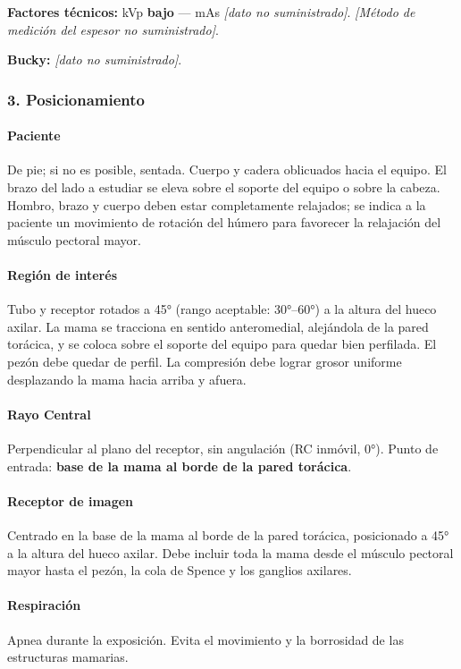 	\textbf{Factores técnicos:} kVp \textbf{bajo} --- mAs \textit{[dato no suministrado]}. \textit{[Método de medición del espesor no suministrado]}.
	
	\textbf{Bucky:} \textit{[dato no suministrado]}.
	
	\subsubsection*{3. Posicionamiento}
	
	\paragraph{Paciente}
	De pie; si no es posible, sentada. Cuerpo y cadera oblicuados hacia el equipo. El brazo del lado a estudiar se eleva sobre el soporte del equipo o sobre la cabeza. Hombro, brazo y cuerpo deben estar completamente relajados; se indica a la paciente un movimiento de rotación del húmero para favorecer la relajación del músculo pectoral mayor.
	
	\paragraph{Región de interés}
	Tubo y receptor rotados a 45° (rango aceptable: 30°--60°) a la altura del hueco axilar. La mama se tracciona en sentido anteromedial, alejándola de la pared torácica, y se coloca sobre el soporte del equipo para quedar bien perfilada. El pezón debe quedar de perfil. La compresión debe lograr grosor uniforme desplazando la mama hacia arriba y afuera.
	
	\paragraph{Rayo Central}
	Perpendicular al plano del receptor, sin angulación (RC inmóvil, 0°). Punto de entrada: \textbf{base de la mama al borde de la pared torácica}.
	
	\paragraph{Receptor de imagen}
	Centrado en la base de la mama al borde de la pared torácica, posicionado a 45° a la altura del hueco axilar. Debe incluir toda la mama desde el músculo pectoral mayor hasta el pezón, la cola de Spence y los ganglios axilares.
	
	\paragraph{Respiración}
	Apnea durante la exposición. Evita el movimiento y la borrosidad de las estructuras mamarias.
	
